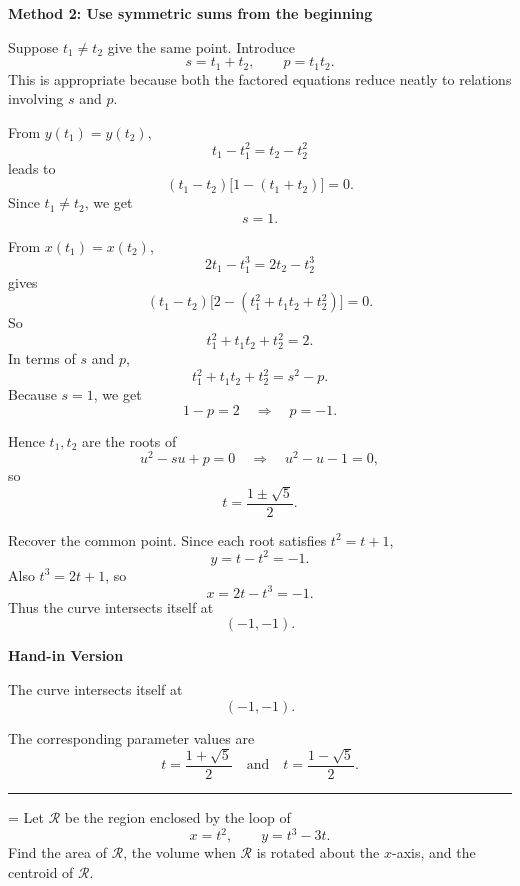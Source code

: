 \documentclass[a4paper,12pt,twocolumn]{article}
\newlength{\problemnumberwidth}
\newenvironment{solutionbox}{\begin{framed}}{\end{framed}}
\newcommand{\sectiontitle}[2]{%
  \hypertarget{#1}{}%
  \par\vspace{0.8em}%
  \noindent{\Large\bfseries #2}\par
  \vspace{0.3em}%
  \hrule
  \vspace{0.8em}%
}
\newcommand{\problem}[3]{%
  \Needspace{10\baselineskip}%
  \phantomsection\label{#1}%
  \par\vspace{0.8em}%
  \noindent
  \hangindent=\problemnumberwidth
  \hangafter=1
  \makebox[\problemnumberwidth][l]{\textbf{#2.}}#3\par
}
\begin{document}
\begin{solutionbox}
\textbf{Method 2: Use symmetric sums from the beginning}

\begin{steps}
\item Suppose \(t_1\neq t_2\) give the same point. Introduce
\[
s=t_1+t_2,
\qquad
p=t_1t_2.
\]
This is appropriate because both the factored equations reduce neatly to relations involving \(s\) and \(p\).

\item From \(y(t_1)=y(t_2)\),
\[
t_1-t_1^2=t_2-t_2^2
\]
leads to
\[
(t_1-t_2)\bigl[1-(t_1+t_2)\bigr]=0.
\]
Since \(t_1\neq t_2\), we get
\[
s=1.
\]

\item From \(x(t_1)=x(t_2)\),
\[
2t_1-t_1^3=2t_2-t_2^3
\]
gives
\[
(t_1-t_2)\bigl[2-(t_1^2+t_1t_2+t_2^2)\bigr]=0.
\]
So
\[
t_1^2+t_1t_2+t_2^2=2.
\]
In terms of \(s\) and \(p\),
\[
t_1^2+t_1t_2+t_2^2=s^2-p.
\]
Because \(s=1\), we get
\[
1-p=2
\quad\Longrightarrow\quad
p=-1.
\]

\item Hence \(t_1,t_2\) are the roots of
\[
u^2-su+p=0
\quad\Longrightarrow\quad
u^2-u-1=0,
\]
so
\[
t=\frac{1\pm\sqrt5}{2}.
\]

\item Recover the common point. Since each root satisfies \(t^2=t+1\),
\[
y=t-t^2=-1.
\]
Also \(t^3=2t+1\), so
\[
x=2t-t^3=-1.
\]
Thus the curve intersects itself at
\[
(-1,-1).
\]
\end{steps}
\end{solutionbox}

\begin{solutionbox}
\textbf{Hand-in Version}

The curve intersects itself at
\[
\boxed{(-1,-1)}.
\]

The corresponding parameter values are
\[
\boxed{t=\frac{1+\sqrt5}{2}\quad\text{and}\quad t=\frac{1-\sqrt5}{2}.}
\]
\end{solutionbox}

\sectiontitle{sec:10-2}{10-2}

\problem{prob:10-2-42}{42}{Let \(\mathcal{R}\) be the region enclosed by the loop of
\[
x=t^2,\qquad y=t^3-3t.
\]
Find the area of \(\mathcal{R}\), the volume when \(\mathcal{R}\) is rotated about the \(x\)-axis, and the centroid of \(\mathcal{R}\).}
\end{document}
